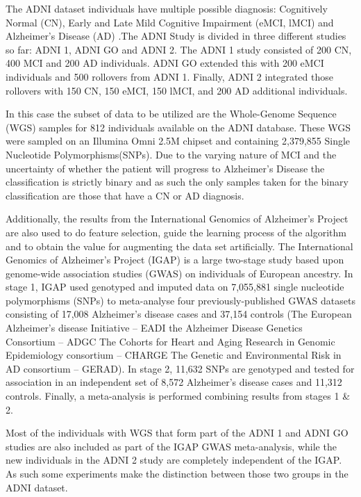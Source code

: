 The ADNI dataset individuals have multiple possible diagnosis: Cognitively Normal (CN), Early and Late Mild Cognitive Impairment (eMCI, lMCI) and Alzheimer's Disease (AD) .The ADNI Study is divided in three different studies so far: ADNI 1, ADNI GO and ADNI 2. The ADNI 1 study consisted of 200 CN, 400 MCI and 200 AD individuals. ADNI GO extended this with 200 eMCI individuals and 500 rollovers from ADNI 1. Finally, ADNI 2 integrated those rollovers with 150 CN, 150 eMCI, 150 lMCI, and 200 AD additional individuals. 

In this case the subset of data to be utilized are the Whole-Genome Sequence (WGS) samples for 812 individuals available on the ADNI database. These WGS were sampled on an Illumina Omni 2.5M chipset and containing 2,379,855 Single Nucleotide Polymorphisms(SNPs).  Due to the varying nature of MCI and the uncertainty of whether the patient will progress to Alzheimer's Disease the classification is strictly binary and as such the only samples taken for the binary classification are those that have a CN or AD diagnosis. 

Additionally, the results from the International Genomics of Alzheimer's Project\cite{Lambert2013} are also used to do feature selection, guide the learning process of the algorithm and to obtain the value for augmenting the data set artificially. The International Genomics of Alzheimer's Project (IGAP) is a large two-stage study based upon genome-wide association studies (GWAS) on individuals of European ancestry. In stage 1, IGAP used genotyped and imputed data on 7,055,881 single nucleotide polymorphisms (SNPs) to meta-analyse four previously-published GWAS datasets consisting of 17,008 Alzheimer's disease cases and 37,154 controls (The European Alzheimer's disease Initiative – EADI the Alzheimer Disease Genetics Consortium – ADGC The Cohorts for Heart and Aging Research in Genomic Epidemiology consortium – CHARGE The Genetic and Environmental Risk in AD consortium – GERAD). In stage 2, 11,632 SNPs are genotyped and tested for association in an independent set of 8,572 Alzheimer's disease cases and 11,312 controls. Finally, a meta-analysis is performed combining results from stages 1 \& 2.

Most of the individuals with WGS that form part of the ADNI 1 and ADNI GO studies are also included as part of the IGAP GWAS meta-analysis, while the new individuals in the ADNI 2 study are completely independent of the IGAP. As such some experiments make the distinction between those two groups in the ADNI dataset.


